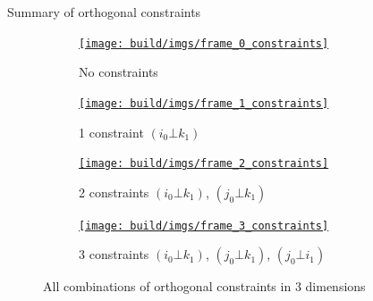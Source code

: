 \documentclass[10pt, xcolor={usenames, dvipsnames}]{beamer}
\begin{document}
        \begin{frame}{Summary of orthogonal constraints}
            \begin{figure}
                \begin{subfigure}[t]{0.24\textwidth}
                    \centering
                    \href{run:frame_0_constraints.mp4?autostart&loop}{\texttt{[image: build/imgs/frame\_0\_constraints]}}
                    \caption{No constraints}
                    \label{fig:constraints_0}
                \end{subfigure}
                \hfill
                \begin{subfigure}[t]{0.24\textwidth}
                    \centering
                    \href{run:frame_1_constraints.mp4?autostart&loop}{\texttt{[image: build/imgs/frame\_1\_constraints]}}
                    \caption{1 constraint $(i_0 \bot k_1)$}
                    \label{fig:constraints_1}
                \end{subfigure}
                \hfill
                \begin{subfigure}[t]{0.24\textwidth}
                    \centering
                    \href{run:frame_2_constraints.mp4?autostart&loop}{\texttt{[image: build/imgs/frame\_2\_constraints]}}
                    \caption{2 constraints $(i_0 \bot k_1)$, $(j_0 \bot k_1)$}
                    \label{fig:constraints_2}
                \end{subfigure}
                \hfill
                \begin{subfigure}[t]{0.24\textwidth}
                    \centering
                    \href{run:frame_3_constraints.mp4?autostart&loop}{\texttt{[image: build/imgs/frame\_3\_constraints]}}
                    \caption{3 constraints $(i_0 \bot k_1)$, $(j_0 \bot k_1)$, $(j_0 \bot i_1)$}
                    \label{fig:constraints_3}
                \end{subfigure}
                \caption{All combinations of orthogonal constraints in 3 dimensions}
            \end{figure}
        \end{frame}




\end{document}
